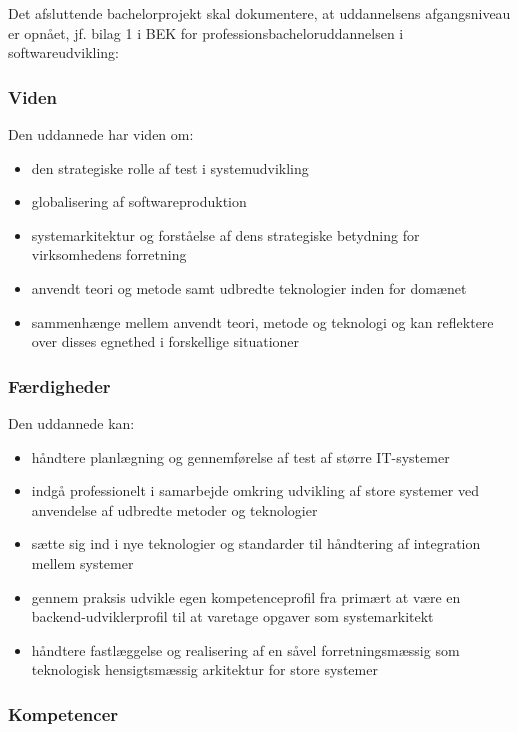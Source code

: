 \documentclass[11pt]{article}
\begin{document}
Det afsluttende bachelorprojekt skal dokumentere, at uddannelsens afgangsniveau er opnået, jf. bilag 1 i BEK for professionsbacheloruddannelsen i softwareudvikling: \\
\subsubsection{Viden}
Den uddannede har viden om:
\begin{itemize}
\item den strategiske rolle af test i systemudvikling
\item globalisering af softwareproduktion
\item systemarkitektur og forståelse af dens strategiske betydning for virksomhedens forretning
\item anvendt teori og metode samt udbredte teknologier inden for domænet
\item sammenhænge mellem anvendt teori, metode og teknologi og kan reflektere over disses egnethed i forskellige situationer
\end{itemize}
\subsubsection{Færdigheder} 
Den uddannede kan:
\begin{itemize}
\item håndtere planlægning og gennemførelse af test af større IT-systemer
\item indgå professionelt i samarbejde omkring udvikling af store systemer ved anvendelse af udbredte metoder og teknologier
\item sætte sig ind i nye teknologier og standarder til håndtering af integration mellem systemer

\item gennem praksis udvikle egen kompetenceprofil fra primært at være en backend-udviklerprofil til at varetage opgaver som
systemarkitekt
\item håndtere fastlæggelse og realisering af en såvel forretningsmæssig som teknologisk hensigtsmæssig arkitektur for store systemer

\end{itemize}

\subsubsection{Kompetencer}
\end{document}
